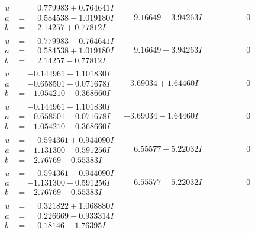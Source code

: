 \documentclass[1p]{elsarticle_modified}
\theoremstyle{definition}
\begin{document}
$$\begin{array}{c|c|c}
\begin{aligned}
u &= \phantom{-}0.779983 + 0.764641 I \\
a &= \phantom{-}0.584538 - 1.019180 I \\
b &= \phantom{-}2.14257 + 0.77812 I\end{aligned}
 & \phantom{-}9.16649 - 3.94263 I & \phantom{-0.000000 } 0 \\ \hline\begin{aligned}
u &= \phantom{-}0.779983 - 0.764641 I \\
a &= \phantom{-}0.584538 + 1.019180 I \\
b &= \phantom{-}2.14257 - 0.77812 I\end{aligned}
 & \phantom{-}9.16649 + 3.94263 I & \phantom{-0.000000 } 0 \\ \hline\begin{aligned}
u &= -0.144961 + 1.101830 I \\
a &= -0.658501 - 0.071678 I \\
b &= -1.054210 + 0.368660 I\end{aligned}
 & -3.69034 + 1.64460 I & \phantom{-0.000000 } 0 \\ \hline\begin{aligned}
u &= -0.144961 - 1.101830 I \\
a &= -0.658501 + 0.071678 I \\
b &= -1.054210 - 0.368660 I\end{aligned}
 & -3.69034 - 1.64460 I & \phantom{-0.000000 } 0 \\ \hline\begin{aligned}
u &= \phantom{-}0.594361 + 0.944090 I \\
a &= -1.131300 + 0.591256 I \\
b &= -2.76769 - 0.55383 I\end{aligned}
 & \phantom{-}6.55577 + 5.22032 I & \phantom{-0.000000 } 0 \\ \hline\begin{aligned}
u &= \phantom{-}0.594361 - 0.944090 I \\
a &= -1.131300 - 0.591256 I \\
b &= -2.76769 + 0.55383 I\end{aligned}
 & \phantom{-}6.55577 - 5.22032 I & \phantom{-0.000000 } 0 \\ \hline\begin{aligned}
u &= \phantom{-}0.321822 + 1.068880 I \\
a &= \phantom{-}0.226669 - 0.933314 I \\
b &= \phantom{-}0.18146 - 1.76395 I\end{aligned}

\end{array}$$
\end{document}
